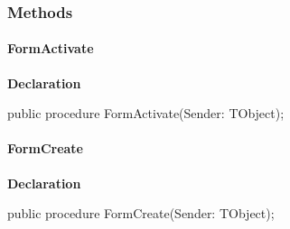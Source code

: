 \documentclass{report}
\newif\ifpdf
\begin{document}
\subsubsection*{\large{\textbf{Methods}}\normalsize\hspace{1ex}\hfill}
\paragraph*{FormActivate}\hspace*{\fill}

\label{thinstall.TisFrm-FormActivate}
\begin{list}{}{
\setlength{\itemindent}{0cm}
\setlength{\listparindent}{0cm}
\setlength{\leftmargin}{\evensidemargin}
\addtolength{\leftmargin}{\tmplength}
\settowidth{\labelsep}{X}
\addtolength{\leftmargin}{\labelsep}
\setlength{\labelwidth}{\tmplength}
}
\item[\textbf{Declaration}\hfill]
\ifpdf
\begin{flushleft}
\fi
\begin{ttfamily}
public procedure FormActivate(Sender: TObject);\end{ttfamily}

\ifpdf
\end{flushleft}
\fi

\end{list}
\paragraph*{FormCreate}\hspace*{\fill}

\label{thinstall.TisFrm-FormCreate}
\begin{list}{}{
\setlength{\itemindent}{0cm}
\setlength{\listparindent}{0cm}
\setlength{\leftmargin}{\evensidemargin}
\addtolength{\leftmargin}{\tmplength}
\settowidth{\labelsep}{X}
\addtolength{\leftmargin}{\labelsep}
\setlength{\labelwidth}{\tmplength}
}
\item[\textbf{Declaration}\hfill]
\ifpdf
\begin{flushleft}
\fi
\begin{ttfamily}
public procedure FormCreate(Sender: TObject);\end{ttfamily}

\ifpdf
\end{flushleft}
\fi

\end{list}
\end{document}
